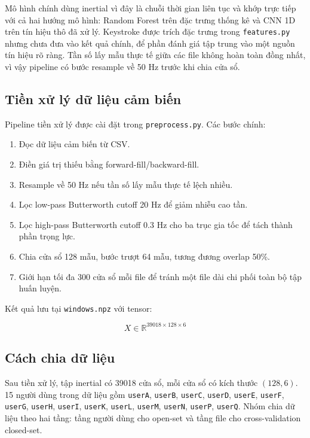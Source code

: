\documentclass[12pt,a4paper]{article}
\begin{document}
Mô hình chính dùng inertial vì đây là chuỗi thời gian liên tục và khớp trực tiếp với cả hai hướng mô hình: Random Forest trên đặc trưng thống kê và CNN 1D trên tín hiệu thô đã xử lý. Keystroke được trích đặc trưng trong \texttt{features.py} nhưng chưa đưa vào kết quả chính, để phần đánh giá tập trung vào một nguồn tín hiệu rõ ràng. Tần số lấy mẫu thực tế giữa các file không hoàn toàn đồng nhất, vì vậy pipeline có bước resample về 50 Hz trước khi chia cửa sổ.

\subsection{Tiền xử lý dữ liệu cảm biến}

Pipeline tiền xử lý được cài đặt trong \texttt{preprocess.py}. Các bước chính:

\begin{enumerate}
    \item Đọc dữ liệu cảm biến từ CSV.
    \item Điền giá trị thiếu bằng forward-fill/backward-fill.
    \item Resample về 50 Hz nếu tần số lấy mẫu thực tế lệch nhiều.
    \item Lọc low-pass Butterworth cutoff 20 Hz để giảm nhiễu cao tần.
    \item Lọc high-pass Butterworth cutoff 0.3 Hz cho ba trục gia tốc để tách thành phần trọng lực.
    \item Chia cửa sổ 128 mẫu, bước trượt 64 mẫu, tương đương overlap 50\%.
    \item Giới hạn tối đa 300 cửa sổ mỗi file để tránh một file dài chi phối toàn bộ tập huấn luyện.
\end{enumerate}

Kết quả lưu tại \texttt{windows.npz} với tensor:

\[
X \in \mathbb{R}^{39018 \times 128 \times 6}
\]

\subsection{Cách chia dữ liệu}

Sau tiền xử lý, tập inertial có 39018 cửa sổ, mỗi cửa sổ có kích thước \((128, 6)\). 15 người dùng trong dữ liệu gồm \texttt{userA}, \texttt{userB}, \texttt{userC}, \texttt{userD}, \texttt{userE}, \texttt{userF}, \texttt{userG}, \texttt{userH}, \texttt{userI}, \texttt{userK}, \texttt{userL}, \texttt{userM}, \texttt{userN}, \texttt{userP}, \texttt{userQ}. Nhóm chia dữ liệu theo hai tầng: tầng người dùng cho open-set và tầng file cho cross-validation closed-set.
\end{document}
